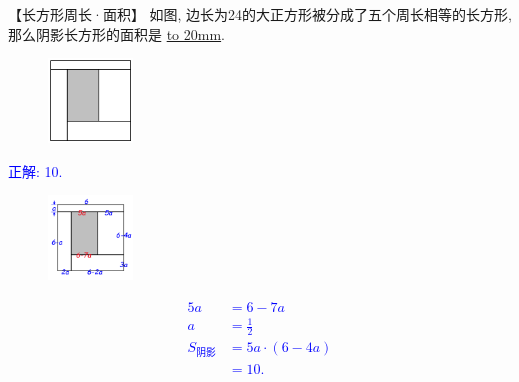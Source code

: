 \item {
    【长方形周长·面积】
    如图, 边长为24的大正方形被分成了五个周长相等的长方形, 那么阴影长方形的面积是 \underline{\hbox to 20mm{}}.
    \begin{figure}[H] 
        \centering
        \includegraphics[width=0.2\textwidth]{./pics/Chapter_2/2.png}
    \end{figure}
    \ifshowSolution 
        \fangsong{}\textcolor{blue}{
            正解: 10.\\
            \begin{figure}[H] 
                \centering
                \includegraphics[width=0.2\textwidth]{./pics/Chapter_2/seikai_2.png}
            \end{figure}
            \begin{align*}
                5a &= 6-7a \\
                a &= \frac12 \\
                S_{阴影} &= 5a\cdot (6-4a)\\
                &= 10.
            \end{align*}
        }
    \else
        \vspace{1cm}
    \fi
}
